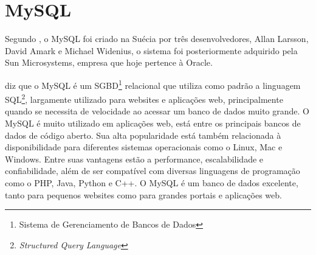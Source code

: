 \section{MySQL}
	\par Segundo , o MySQL foi criado na Suécia por três desenvolvedores, Allan Larsson, David Amark e Michael Widenius, o sistema foi posteriormente adquirido pela Sun Microsystems, empresa que hoje pertence à Oracle.
	\par {} diz que o MySQL é um SGBD\footnote{Sistema de Gerenciamento de Bancos de Dados} relacional que utiliza como padrão a linguagem SQL\footnote{\textit{Structured Query Language}}, largamente utilizado para websites e aplicações web, principalmente quando se necessita de velocidade ao acessar um banco de dados muito grande. O MySQL é muito utilizado em aplicações web, está entre os principais bancos de dados de código aberto. Sua alta popularidade está também relacionada à disponibilidade para diferentes sistemas operacionais como o Linux, Mac e Windows. Entre suas vantagens estão a performance, escalabilidade e confiabilidade, além de ser compatível com diversas linguagens de programação como o PHP, Java, Python e C++. O MySQL é um banco de dados excelente, tanto para pequenos websites como para grandes portais e aplicações web.

